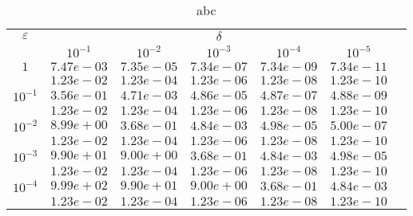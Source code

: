 \documentclass[10pt,twoside]{uz_kgu}
\begin{document}
\begin{table} [!htb]
    \caption {abc}
        \begin{center}
\begin{tabular}{|c|c|c|c|c|c|c}
\cline{1-6} $\varepsilon$ & \multicolumn{5}{c|}{$\delta$} \\
\cline{2-6} &$10^{-1}$ & $10^{-2}$ & $10^{-3}$  & $10^{-4}$& $10^{-5}$\\
\cline{1-6}
$1$
&$7.47e-03$&$7.35e-05$&$7.34e-07$&$7.34e-09$& $7.34e-11$\\
&$1.23e-02$&$1.23e-04$&$1.23e-06$&$1.23e-08$& $1.23e-10$\\
\cline{1-6}
$10^{-1}$
&$3.56e-01$&$4.71e-03$&$4.86e-05$&$4.87e-07$&$4.88e-09$\\
&$1.23e-02$&$1.23e-04$&$1.23e-06$&$1.23e-08$&$1.23e-10$\\
\cline{1-6}
$10^{-2}$
&$8.99e+00$&$3.68e-01$&$4.84e-03$&$4.98e-05$&$5.00e-07$\\
&$1.23e-02$&$1.23e-04$&$1.23e-06$&$1.23e-08$&$1.23e-10$\\
\cline{1-6}
$10^{-3}$
&$9.90e+01$&$9.00e+00$&$3.68e-01$&$4.84e-03$&$4.98e-05$\\
&$1.23e-02$&$1.23e-04$&$1.23e-06$&$1.23e-08$&$1.23e-10$\\
\cline{1-6}
$10^{-4}$
&$9.99e+02$&$9.90e+01$&$9.00e+00$&$3.68e-01$&$4.84e-03$\\
&$1.23e-02$&$1.23e-04$&$1.23e-06$&$1.23e-08$&$1.23e-10$\\
\cline{1-6}
        \end{tabular}
    \end{center}
\end{table}
\end{document}
